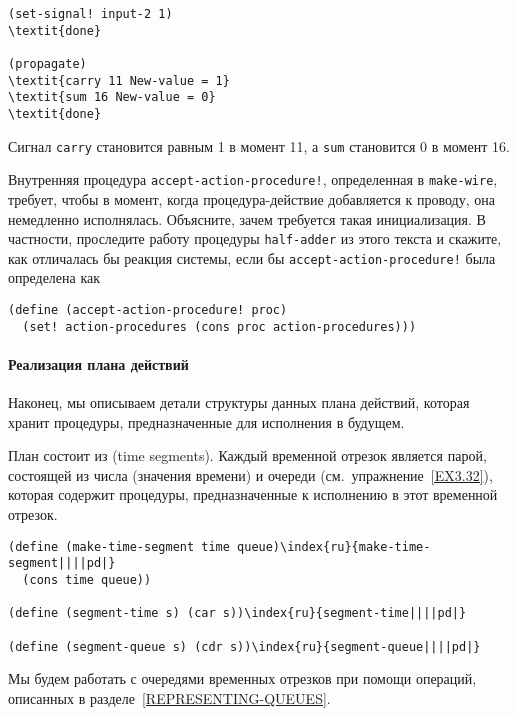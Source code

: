 \begin{Verbatim}[fontsize=\small]
(set-signal! input-2 1)
\textit{done}

(propagate)
\textit{carry 11 New-value = 1}
\textit{sum 16 New-value = 0}
\textit{done}
\end{Verbatim}
Сигнал {\tt carry} становится равным 1 в момент 11, а
{\tt sum} становится 0 в момент 16.
\begin{exercise}{3.31}\label{EX3.31}%
Внутренняя процедура
{\tt accept-action-procedure!}, определенная в
{\tt make-wire},
требует, чтобы в момент, когда
процедура-действие добавляется к проводу, она немедленно исполнялась.
Объясните, зачем требуется такая инициализация.  В частности,
проследите работу процедуры {\tt half-adder} из этого текста и
скажите, как отличалась бы реакция системы, если бы
{\tt accept-action-procedure!} была определена как

\begin{Verbatim}[fontsize=\small]
(define (accept-action-procedure! proc)
  (set! action-procedures (cons proc action-procedures)))
\end{Verbatim}
\end{exercise}

\paragraph{Реализация плана действий}


Наконец, мы описываем детали структуры данных плана
действий, которая хранит процедуры, предназначенные для исполнения в
будущем.

План состоит из
 (time segments). Каждый
временной отрезок является парой, состоящей из числа (значения
времени) и очереди (см.~упражнение~\ref{EX3.32}), которая
содержит процедуры, предназначенные к исполнению в этот временной
отрезок.

\begin{Verbatim}[fontsize=\small]
(define (make-time-segment time queue)\index{ru}{make-time-segment||||pd|}
  (cons time queue))

(define (segment-time s) (car s))\index{ru}{segment-time||||pd|}

(define (segment-queue s) (cdr s))\index{ru}{segment-queue||||pd|}
\end{Verbatim}
Мы будем работать с очередями временных отрезков при помощи операций,
описанных в разделе~\ref{REPRESENTING-QUEUES}.

